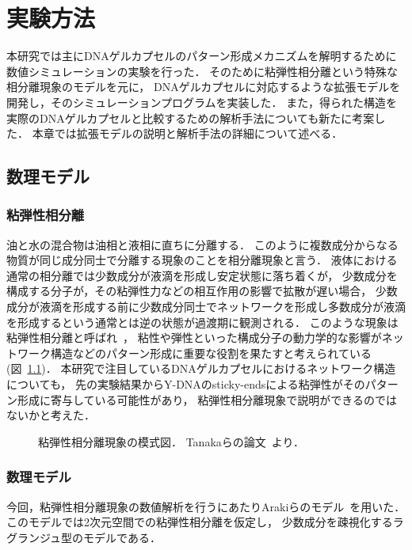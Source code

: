 \chapter{実験方法}
\label{sec:model}

本研究では主にDNAゲルカプセルのパターン形成メカニズムを解明するために数値シミュレーションの実験を行った．
そのために粘弾性相分離という特殊な相分離現象のモデルを元に，
DNAゲルカプセルに対応するような拡張モデルを開発し，そのシミュレーションプログラムを実装した．
また，得られた構造を実際のDNAゲルカプセルと比較するための解析手法についても新たに考案した．
本章では拡張モデルの説明と解析手法の詳細について述べる．

\section{数理モデル}

\subsection{粘弾性相分離}
油と水の混合物は油相と液相に直ちに分離する．
このように複数成分からなる物質が同じ成分同士で分離する現象のことを相分離現象と言う．
液体における通常の相分離では少数成分が液滴を形成し安定状態に落ち着くが，
少数成分を構成する分子が，その粘弾性力などの相互作用の影響で拡散が遅い場合，
少数成分が液滴を形成する前に少数成分同士でネットワークを形成し多数成分が液滴を形成するという通常とは逆の状態が過渡期に観測される．
このような現象は粘弾性相分離と呼ばれ~\cite{tanaka2009formation}，
粘性や弾性といった構成分子の動力学的な影響がネットワーク構造などのパターン形成に重要な役割を果たすと考えられている(図~\ref{fig:veps})．
本研究で注目しているDNAゲルカプセルにおけるネットワーク構造についても，
先の実験結果からY-DNAのsticky-endsによる粘弾性がそのパターン形成に寄与している可能性があり，
粘弾性相分離現象で説明ができるのではないかと考えた．

\begin{figure}
\centering

\caption{
    粘弾性相分離現象の模式図．
    Tanakaらの論文~\cite{tanaka2009formation}より．
}

\label{fig:veps}
\end{figure}

\subsection{数理モデル}
今回，粘弾性相分離現象の数値解析を行うにあたりArakiらのモデル~\cite{araki2005simple}を用いた．
このモデルでは2次元空間での粘弾性相分離を仮定し，
少数成分を疎視化するラグランジュ型のモデルである．

